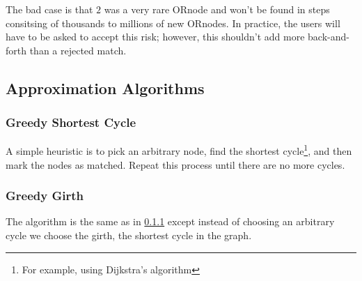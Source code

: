 \documentclass[main.tex]{subfiles}
\begin{document}
The bad case is that $2$ was a very rare ORnode and won't be found in steps consitsing of thousands to millions of new ORnodes. In practice, the users will have to be asked to accept this risk; however, this shouldn't add more back-and-forth than a rejected match.


\subsection{Approximation Algorithms}

\subsubsection{Greedy Shortest Cycle}\label{sec:gsc}
A simple heuristic is to pick an arbitrary node, find the shortest cycle\footnote{For example, using Dijkstra's algorithm}, and then mark the nodes as matched. Repeat this process until there are no more cycles.

\subsubsection{Greedy Girth}
The algorithm is the same as in \ref{sec:gsc} except instead of choosing an arbitrary cycle we choose the girth, the shortest cycle in the graph.
\end{document}
